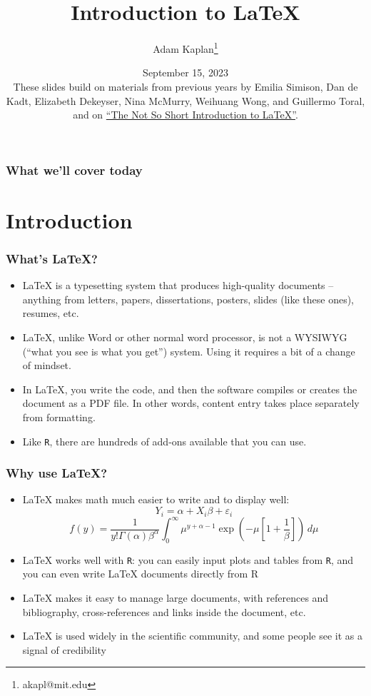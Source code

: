 \documentclass[xcolor=dvipsnames]{beamer} %
\title{Introduction to \LaTeX}
\author[Kaplan]{Adam Kaplan\footnote{akapl@mit.edu}}
\date[Sept 15, 2023]{September 15, 2023\\ \vspace{1em} {\footnotesize These slides build on materials from
    previous years by Emilia Simison, Dan de Kadt, Elizabeth Dekeyser, Nina McMurry, Weihuang Wong, and Guillermo Toral, and on \href{https://tobi.oetiker.ch/lshort/lshort.pdf}{``The Not So Short Introduction to \LaTeX{}''}.}}
\begin{document}

\frame{\titlepage}


\begin{frame}
  \frametitle{What we'll cover today}
  \tableofcontents
\end{frame}

\section{Introduction}

\begin{frame}
  \frametitle{What's \LaTeX?}
  \begin{itemize}
    \item \LaTeX{} is a typesetting system that produces high-quality documents --
          anything from letters, papers, dissertations, posters, slides (like
          these ones), resumes, etc. \pause
    \item \LaTeX, unlike Word or other normal word processor, is not a WYSIWYG (``what you see is what
          you get'') system. Using it requires a bit of a change of mindset. \pause
    \item In \LaTeX, you write the code, and then the software compiles or creates
          the document as a PDF file.  In other words, content entry takes place separately from formatting.
          \pause
    \item Like \texttt{R}, there are hundreds of add-ons available that you can use.
  \end{itemize}
\end{frame}


\begin{frame}
  \frametitle{Why use \LaTeX?}
  \begin{itemize}
    \item \LaTeX{} makes math much easier to write and to display well: \pause
          $$ Y_{i} = \alpha + X_i\beta + \varepsilon_i $$ \pause
          $$ f(y) = \frac{1}{y!\Gamma(\alpha)\beta^\alpha}\int_{0}^{\infty} \mu^{y+\alpha-1} \exp\left(-\mu\left[1+\frac{1}{\beta}\right]\right)\,d\mu $$ \pause
    \item \LaTeX{} works well with \texttt{R}: you can easily input plots and tables
          from \texttt{R}, and you can even write \LaTeX{} documents directly from R \pause
    \item \LaTeX{} makes it easy to manage large documents, with references
          and bibliography, cross-references and links inside the document, etc. \pause
    \item \LaTeX{} is used widely in the scientific community, and some people see it as a signal of credibility
  \end{itemize}
\end{frame}
\end{document}
